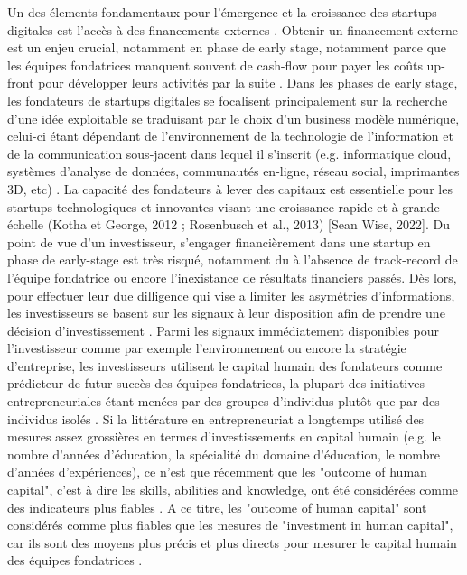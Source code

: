 \documentclass[11pt]{article}
\begin{document}
Un des élements fondamentaux pour l'émergence et la croissance des startups digitales est l'accès à des financements externes \citep{klein2020start}. Obtenir un financement externe est un enjeu crucial, notamment en phase de early stage, notamment parce que les équipes fondatrices manquent souvent de cash-flow pour payer les coûts up-front pour développer leurs activités par la suite \citep{ratzinger2018impact}. Dans les phases de early stage, les fondateurs de startups digitales se focalisent principalement sur la recherche d'une idée exploitable se traduisant par le choix d'un business modèle numérique, celui-ci étant dépendant de l'environnement de la technologie de l’information et de la communication sous-jacent dans lequel il s'inscrit (e.g. informatique cloud, systèmes d’analyse de données, communautés en-ligne, réseau social, imprimantes 3D, etc) \citep{nambisan2017digital}. La capacité des fondateurs à lever des capitaux est essentielle pour les startups technologiques et innovantes visant une croissance rapide et à grande échelle (Kotha et George, 2012 ; Rosenbusch et al., 2013) [Sean Wise, 2022]. Du point de vue d'un investisseur, s'engager financièrement dans une startup en phase de early-stage est très risqué, notamment du à l'absence de track-record de l'équipe fondatrice ou encore l'inexistance de résultats financiers passés. Dès lors, pour effectuer leur due dilligence qui vise a limiter les asymétries d'informations, les investisseurs se basent sur les signaux à leur disposition afin de prendre une décision d'investissement \citep{colombo2021use, ko2018signaling, spence1974market}. Parmi les signaux immédiatement disponibles pour l'investisseur comme par exemple l'environnement ou encore la stratégie d'entreprise, les investisseurs utilisent le capital humain des fondateurs comme prédicteur de futur succès des équipes fondatrices, la plupart des initiatives entrepreneuriales étant menées par des groupes d'individus plutôt que par des individus isolés \citep{roure1990predictors, klotz2014new}. Si la littérature en entrepreneuriat a longtemps utilisé des mesures assez grossières en termes d'investissements en capital humain (e.g. le nombre d'années d'éducation, la spécialité du domaine d'éducation, le nombre d'années d'expériences), ce n'est que récemment que les "outcome of human capital", c'est à dire les skills, abilities and knowledge, ont été considérées comme des indicateurs plus fiables \citep{unger2011human, marvel2016human}. A ce titre, les "outcome of human capital" sont considérés comme plus fiables que les mesures de "investment in human capital", car ils sont des moyens plus précis et plus directs pour mesurer le capital humain des équipes fondatrices \citep{unger2011human}.
\end{document}
